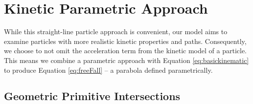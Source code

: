 







\section{Kinetic Parametric Approach}

While this straight-line particle approach is convenient, our model aims to examine particles with more realistic kinetic properties and paths. Consequently, we choose to not omit the acceleration term from the kinetic model of a particle. This means we combine a parametric approach with Equation \eqref{eq:basickinematic} to produce Equation \eqref{eq:freeFall} -- a parabola defined parametrically.



	\subsection{Geometric Primitive Intersections}


